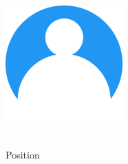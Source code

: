 
\large
\hspace*{70pt}
\begin{minipage}[t]{0.2\paperwidth}
\includegraphics[width=4.5cm]{images/profile}

\vspace{10pt}
\Large
\hspace*{33pt}\textcolor{white}{1st last Name}\\
\hspace*{33pt}\small \textcolor{MaterialGrey200}{Position}
\end{minipage}
